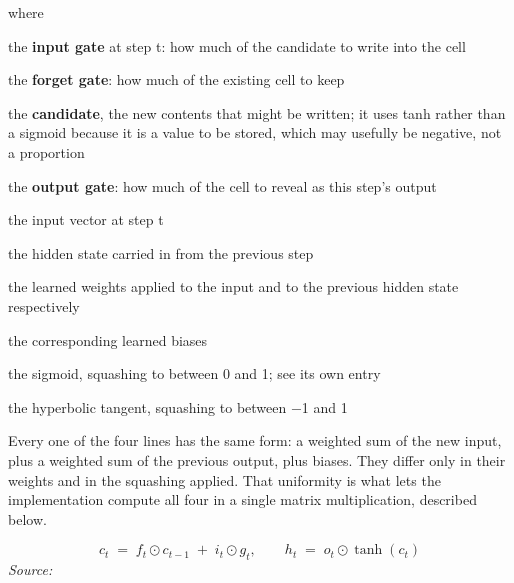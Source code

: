 \noindent where
\begin{description}[leftmargin=2.4em,style=nextline,font=\normalfont\ttfamily]\setlength\itemsep{1pt}
  \item[{$i_t$}] \normalfont the \textbf{input gate} at step t: how much of the candidate to write into the cell
  \item[{$f_t$}] \normalfont the \textbf{forget gate}: how much of the existing cell to keep
  \item[{$g_t$}] \normalfont the \textbf{candidate}, the new contents that might be written; it uses tanh rather than a sigmoid because it is a value to be stored, which may usefully be negative, not a proportion
  \item[{$o_t$}] \normalfont the \textbf{output gate}: how much of the cell to reveal as this step's output
  \item[{$x_t$}] \normalfont the input vector at step t
  \item[{$h_{t-1}$}] \normalfont the hidden state carried in from the previous step
  \item[{$W_{i\ast},\, W_{h\ast}$}] \normalfont the learned weights applied to the input and to the previous hidden state respectively
  \item[{$b_{i\ast},\, b_{h\ast}$}] \normalfont the corresponding learned biases
  \item[{$\sigma$}] \normalfont the sigmoid, squashing to between 0 and 1; see its own entry
  \item[{$\tanh$}] \normalfont the hyperbolic tangent, squashing to between $-$1 and 1
\end{description}
Every one of the four lines has the same form: a weighted sum of the new input, plus a weighted sum of the previous output, plus biases. They differ only in their weights and in the squashing applied. That uniformity is what lets the implementation compute all four in a single matrix multiplication, described below.



\begin{equation}
c_t \;=\; f_t \odot c_{t-1} \;+\; i_t \odot g_t, \qquad h_t \;=\; o_t \odot \tanh(c_t)
\end{equation}
\noindent\emph{Source: }\cite{hochreiter1997}


